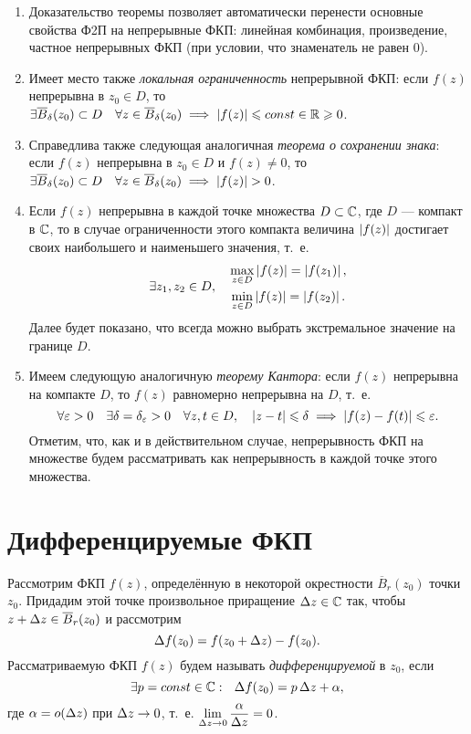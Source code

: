 \documentclass[../../main.tex]{subfiles}
\begin{document}
\begin{rems}
	\;
	
	\begin{enumerate}
		\item Доказательство теоремы позволяет автоматически
		перенести основные свойства Ф2П на непрерывные ФКП:
		линейная комбинация, произведение, частное непрерывных ФКП (при условии, 
		что знаменатель не равен $0$).
		\item Имеет место также \emph{локальная ограниченность} непрерывной ФКП:
		если $f(z)$ непрерывна в $z_0 \in D$, то
		$\exists \overline{B}_{\delta} (z_0) \subset D \quad
		\forall z \in \overline{B}_{\delta} (z_0) \implies
		\left|{f(z)}\right| \leqslant const \in \mathbb{R} \geqslant 0$.
		\item Справедлива также следующая аналогичная
		\emph{теорема о сохранении знака}:
		если $f(z)$ непрерывна в $z_0 \in D$ и $f(z) \ne 0$, то
		$\exists \overline{B}_{\delta} (z_0) \subset D
		\quad \forall z \in \overline{B}_{\delta} (z_0) \implies \left|{f(z)}\right| > 0$.
		\item Если $f(z)$ непрерывна в каждой точке множества $D \subset \mathbb{C}$,
		где $D$ --- компакт в $\mathbb{C}$, то в случае ограниченности этого компакта
		величина $\left|{f(z)}\right|$ достигает своих наибольшего и наименьшего значения,
		т.~е.
		\[
		\exists z_1, z_2 \in D, \quad
		\begin{gathered}
			\max\limits_{z \in D} \left|{f(z)}\right| = \left|{f(z_1)}\right|, \\
			\min\limits_{z \in D} \left|{f(z)}\right| = \left|{f(z_2)}\right|.
		\end{gathered}
		\]
		Далее будет показано, что всегда можно выбрать экстремальное значение
		на границе $D$.
		\item Имеем следующую аналогичную \emph{теорему Кантора}:
		если $f(z)$ непрерывна на компакте $D$,
		то $f(z)$ равномерно непрерывна на $D$, т.~е.
		\[
		\forall \varepsilon > 0 \quad \exists \delta = \delta_{\varepsilon} > 0 \quad
		\forall z, t \in D, \quad \left|{z - t}\right| \leqslant \delta
		\implies \left|{f(z) - f(t)}\right| \leqslant \varepsilon.
		\]
		Отметим, что, как и в действительном случае, непрерывность ФКП на множестве
		будем рассматривать как непрерывность в каждой точке этого множества.
	\end{enumerate}
\end{rems}

\section{Дифференцируемые ФКП}

Рассмотрим ФКП $f(z)$, определённую в некоторой окрестности
$\overline{B}_r (z_0)$ точки $z_0$. Придадим этой точке произвольное 
приращение $\Delta z \in \mathbb{C}$ так,
чтобы $z + \Delta z \in \overline{B}_r (z_0)$ и рассмотрим
\begin{equation}
\label{lec28:3}
\Delta f(z_0) = f(z_0 + \Delta z) - f(z_0).
\end{equation}
Рассматриваемую ФКП $f(z)$ будем называть \emph{дифференцируемой} в $z_0$,
если
\begin{equation}
\label{lec28:4}
\exists p = const \in \mathbb{C} : \ \
\Delta f(z_0) = p\, \Delta z + \alpha,
\end{equation}
где $\alpha = o(\Delta z)$ при $\Delta z \to 0$,
т.~е. $\lim\limits_{\Delta z \to 0} \dfrac{\alpha}{\Delta z} = 0$.
\end{document}
